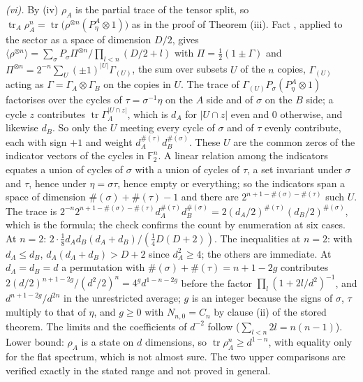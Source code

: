 \emph{(vi).} By (iv) $\rho_{A}$ is the partial trace of the tensor split, so $\operatorname{tr}_{A}\rho_{A}^{n} = \operatorname{tr}\bigl(\rho^{\otimes n}(P^{A}_{\eta} \otimes 1)\bigr)$ as in the proof of Theorem (iii). Fact , applied to the sector as a space of dimension $D/2$, gives $\langle\rho^{\otimes n}\rangle = \sum_{\sigma}P_{\sigma}\Pi^{\otimes n}/\prod_{l<n}(D/2 + l)$ with $\Pi = \tfrac12(1 \pm \Gamma)$ and $\Pi^{\otimes n} = 2^{-n}\sum_{U}(\pm 1)^{|U|}\Gamma_{(U)}$, the sum over subsets $U$ of the $n$ copies, $\Gamma_{(U)}$ acting as $\Gamma = \Gamma_{A} \otimes \Gamma_{B}$ on the copies in $U$. The trace of $\Gamma_{(U)}P_{\sigma}(P^{A}_{\eta} \otimes 1)$ factorises over the cycles of $\tau = \sigma^{-1}\eta$ on the $A$ side and of $\sigma$ on the $B$ side; a cycle $z$ contributes $\operatorname{tr}\Gamma_{A}^{|U \cap z|}$, which is $d_{A}$ for $|U \cap z|$ even and $0$ otherwise, and likewise $d_{B}$. So only the $U$ meeting every cycle of $\sigma$ and of $\tau$ evenly contribute, each with sign $+1$ and weight $d_{A}^{\#(\tau)}d_{B}^{\#(\sigma)}$. These $U$ are the common zeros of the indicator vectors of the cycles in $\mathbb{F}_{2}^{n}$. A linear relation among the indicators equates a union of cycles of $\sigma$ with a union of cycles of $\tau$, a set invariant under $\sigma$ and $\tau$, hence under $\eta = \sigma\tau$, hence empty or everything; so the indicators span a space of dimension $\#(\sigma) + \#(\tau) - 1$ and there are $2^{n + 1 - \#(\sigma) - \#(\tau)}$ such $U$. The trace is $2^{-n}2^{n+1-\#(\sigma)-\#(\tau)}d_{A}^{\#(\tau)}d_{B}^{\#(\sigma)} = 2(d_{A}/2)^{\#(\tau)}(d_{B}/2)^{\#(\sigma)}$, which is the formula; the check confirms the count by enumeration at six cases. At $n = 2$: $2\cdot\tfrac18 d_{A}d_{B}(d_{A} + d_{B})/(\tfrac14 D(D + 2))$. The inequalities at $n = 2$: with $d_{A} \le d_{B}$, $d_{A}(d_{A} + d_{B}) > D + 2$ since $d_{A}^{2} \ge 4$; the others are immediate. At $d_{A} = d_{B} = d$ a permutation with $\#(\sigma) + \#(\tau) = n + 1 - 2g$ contributes $2(d/2)^{n+1-2g}/(d^{2}/2)^{n} = 4^{g}d^{1-n-2g}$ before the factor $\prod_{l}(1 + 2l/d^{2})^{-1}$, and $d^{n+1-2g}/d^{2n}$ in the unrestricted average; $g$ is an integer because the signs of $\sigma$, $\tau$ multiply to that of $\eta$, and $g \ge 0$ with $N_{n,0} = C_{n}$ by clause (ii) of the stored theorem. The limits and the coefficients of $d^{-2}$ follow ($\sum_{l<n}2l = n(n-1)$). Lower bound: $\rho_{A}$ is a state on $d$ dimensions, so $\operatorname{tr}\rho_{A}^{n} \ge d^{1-n}$, with equality only for the flat spectrum, which is not almost sure. The two upper comparisons are verified exactly in the stated range and not proved in general.

